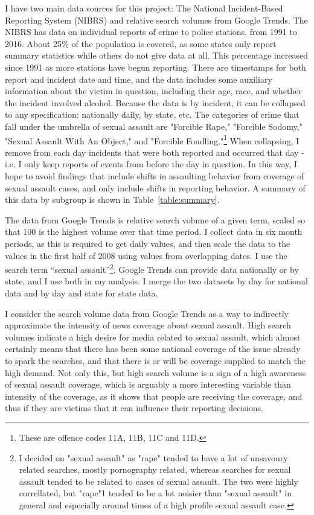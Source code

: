 \documentclass[AER,draftmode]{AEA}
\begin{document}
I have two main data sources for this project: The National Incident-Based Reporting System (NIBRS) and relative search volumes from Google Trends. The NIBRS has data on individual reports of crime to police stations, from 1991 to 2016. About 25\% of the population is covered, as some states only report summary statistics while others do not give data at all. This percentage increased since 1991 as more stations have begun reporting. There are timestamps for both report and incident date and time, and the data includes some auxiliary information about the victim in question, including their age, race, and whether the incident involved alcohol. Because the data is by incident, it can be collapsed to any specification: nationally daily, by state, etc. The categories of crime that fall under the umbrella of sexual assault are "Forcible Rape," "Forcible Sodomy," "Sexual Assault With An Object," and "Forcible Fondling."\footnote{These are offence codes 11A, 11B, 11C and 11D.} When collapsing, I remove from each day incidents that were both reported and occurred that day - i.e. I only keep reports of events from before the day in question. In this way, I hope to avoid findings that include shifts in assaulting behavior from coverage of sexual assault cases, and only include shifts in reporting behavior. A summary of this data by subgroup is shown in Table~\ref{table:summary}. 

The data from Google Trends is relative search volume of a given term, scaled so that 100 is the highest volume over that time period. I collect data in six month periods, as this is required to get daily values, and then scale the data to the values in the first half of 2008 using values from overlapping dates. I use the search term ``sexual assault''\footnote{I decided on "sexual assault" as "rape" tended to have a lot of unsavoury related searches, mostly pornography related, whereas searches for sexual assault tended to be related to cases of sexual assault. The two were highly correllated, but "rape"1 tended to be a lot noisier than "sexual assault" in general and especially around times of a high profile sexual assault case.}. Google Trends can provide data nationally or by state, and I use both in my analysis. I merge the two datasets by day for national data and by day and state for state data. 

I consider the search volume data from Google Trends as a way to indirectly approximate the intensity of news coverage about sexual assault. High search volumes indicate a high desire for media related to sexual assault, which almost certainly means that there has been some national coverage of the issue already to spark the searches, and that there is or will be coverage supplied to match the high demand. Not only this, but high search volume is a sign of a high awareness of sexual assault coverage, which is arguably a more interesting variable than intensity of the coverage, as it shows that people are receiving the coverage, and thus if they are victims that it can influence their reporting decisions.
\end{document}
